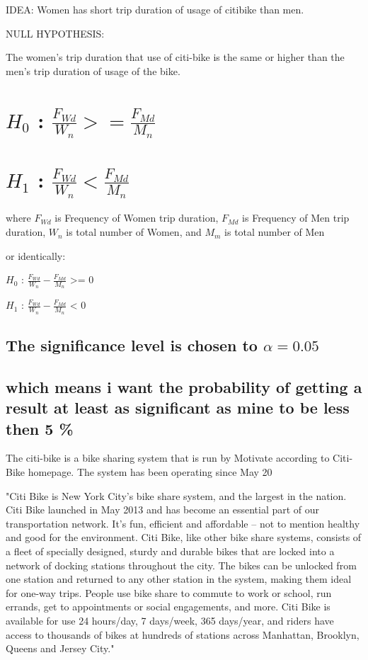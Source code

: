 IDEA:
Women has short trip duration of usage of citibike than men.

NULL HYPOTHESIS:

The women's trip duration that use of citi-bike is the same or higher than the men's trip duration of usage of the bike.

\section{$H_0$ : $\frac{F_{Wd}}{W_{n}} >= \frac{F_{Md}}{M_{n}} $ }



\section{$H_1$ : $\frac{F_{Wd}}{W_{n}} < \frac{F_{Md}}{M_{n}} $}

where $F_{Wd}$ is Frequency of Women trip duration, $F_{Md}$ is Frequency of Men trip duration, ${W_{n}}$ is total number of Women, and ${M_{m}}$ is total number of Men

or identically:

$H_0$ : $\frac{F_{Wd}}{W_{n}} - \frac{F_{Md}}{M_{n}} $ >= 0

$H_1$ : $\frac{F_{Wd}}{W_{n}} - \frac{F_{Md}}{M_{n}} $ < 0

\subsection{The significance level is chosen to $\alpha=0.05$}

\subsection{which means i want the probability of getting a result at least as significant as mine to be less then 5 \%}


The citi-bike is a bike sharing system that is run by Motivate according to Citi-Bike homepage\cite{nyc}. The system has been operating since May 20

"Citi Bike is New York City’s bike share system, and the largest in the nation. Citi Bike launched in May 2013 and has become an essential part of our transportation network. It's fun, efficient and affordable – not to mention healthy and good for the environment.
Citi Bike, like other bike share systems, consists of a fleet of specially designed, sturdy and durable bikes that are locked into a network of docking stations throughout the city. The bikes can be unlocked from one station and returned to any other station in the system, making them ideal for one-way trips. People use bike share to commute to work or school, run errands, get to appointments or social engagements, and more.
Citi Bike is available for use 24 hours/day, 7 days/week, 365 days/year, and riders have access to thousands of bikes at hundreds of stations across Manhattan, Brooklyn, Queens and Jersey City." 